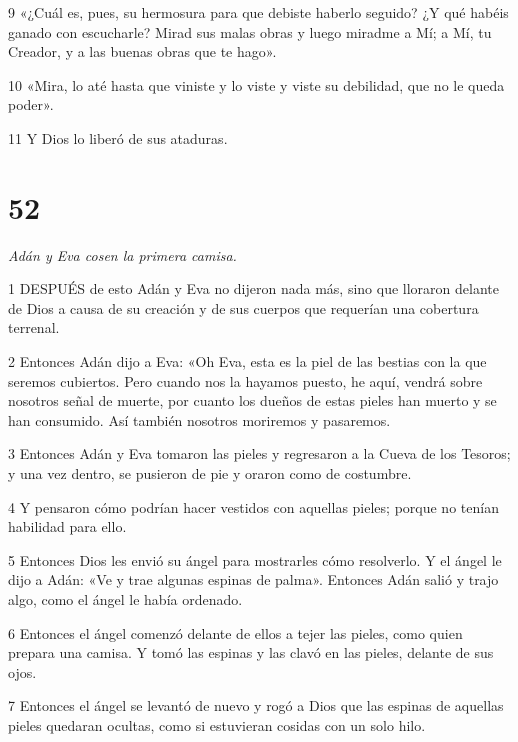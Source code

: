 \par 9 «¿Cuál es, pues, su hermosura para que debiste haberlo seguido? ¿Y qué habéis ganado con escucharle? Mirad sus malas obras y luego miradme a Mí; a Mí, tu Creador, y a las buenas obras que te hago».

\par 10 «Mira, lo até hasta que viniste y lo viste y viste su debilidad, que no le queda poder».

\par 11 Y Dios lo liberó de sus ataduras.

\chapter{52}

\par \textit{Adán y Eva cosen la primera camisa.}

\par 1 DESPUÉS de esto Adán y Eva no dijeron nada más, sino que lloraron delante de Dios a causa de su creación y de sus cuerpos que requerían una cobertura terrenal.

\par 2 Entonces Adán dijo a Eva: «Oh Eva, esta es la piel de las bestias con la que seremos cubiertos. Pero cuando nos la hayamos puesto, he aquí, vendrá sobre nosotros señal de muerte, por cuanto los dueños de estas pieles han muerto y se han consumido. Así también nosotros moriremos y pasaremos.

\par 3 Entonces Adán y Eva tomaron las pieles y regresaron a la Cueva de los Tesoros; y una vez dentro, se pusieron de pie y oraron como de costumbre.

\par 4 Y pensaron cómo podrían hacer vestidos con aquellas pieles; porque no tenían habilidad para ello.

\par 5 Entonces Dios les envió su ángel para mostrarles cómo resolverlo. Y el ángel le dijo a Adán: «Ve y trae algunas espinas de palma». Entonces Adán salió y trajo algo, como el ángel le había ordenado.

\par 6 Entonces el ángel comenzó delante de ellos a tejer las pieles, como quien prepara una camisa. Y tomó las espinas y las clavó en las pieles, delante de sus ojos.

\par 7 Entonces el ángel se levantó de nuevo y rogó a Dios que las espinas de aquellas pieles quedaran ocultas, como si estuvieran cosidas con un solo hilo.

